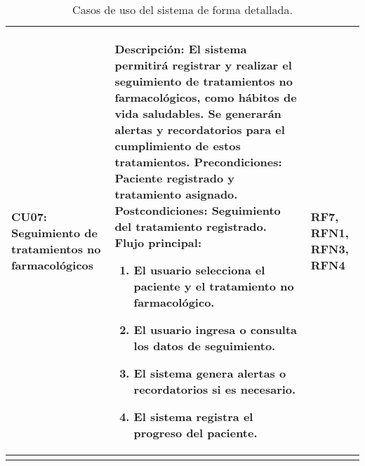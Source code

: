 \begin{longtable}{|p{3cm}|p{9cm}|p{2cm}|}
	\textbf{CU07: Seguimiento de tratamientos no farmacológicos} & 
	\textbf{Descripción:} El sistema permitirá registrar y realizar el seguimiento de tratamientos no farmacológicos, como hábitos de vida saludables. Se generarán alertas y recordatorios para el cumplimiento de estos tratamientos.
	\newline \textbf{Precondiciones:} Paciente registrado y tratamiento asignado.
	\newline \textbf{Postcondiciones:} Seguimiento del tratamiento registrado.
	\newline \textbf{Flujo principal:}
	\begin{enumerate}
		\item El usuario selecciona el paciente y el tratamiento no farmacológico.
		\item El usuario ingresa o consulta los datos de seguimiento.
		\item El sistema genera alertas o recordatorios si es necesario.
		\item El sistema registra el progreso del paciente.
	\end{enumerate}
	& RF7, RFN1, RFN3, RFN4 \\
	\hline
	
	\caption{Casos de uso del sistema de forma detallada.}
\end{longtable}

